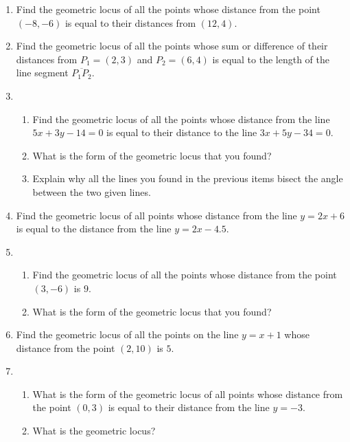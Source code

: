 \begin{enumerate}
\item Find the geometric locus of all the points whose distance from the point $(-8,-6)$ is equal to their distances from $(12,4)$.

\item Find the geometric locus of all the points whose sum or difference of their distances from $P_1=(2,3)$ and $P_2=(6,4)$ is equal to the length of the line segment $\overline{P_1P_2}$.

\item 
\begin{enumerate}
\item Find the geometric locus of all the points whose distance from the line $5x+3y-14=0$ is equal to their distance to the line $3x+5y-34=0$.
\item What is the form of the geometric locus that you found?
\item Explain why all the lines you found in the previous items bisect the angle between the two given lines.
\end{enumerate}

\item Find the geometric locus of all points whose distance from the line $y=2x+6$ is equal to the distance from the line $y=2x-4.5$.

\item 
\begin{enumerate} 
\item Find the geometric locus of all the points whose distance from the point $(3,-6)$ is $9$.
\item What is the form of the geometric locus that you found?
\end{enumerate}

\item Find the geometric locus of all the points on the line $y=x+1$ whose distance from the point $(2,10)$ is $5$.

\item
\begin{enumerate}
\item What is the form of the geometric locus of all points whose distance from the point $(0,3)$ is equal to their distance from the line $y=-3$.
\item What is the geometric locus?
\end{enumerate}

\end{enumerate}

